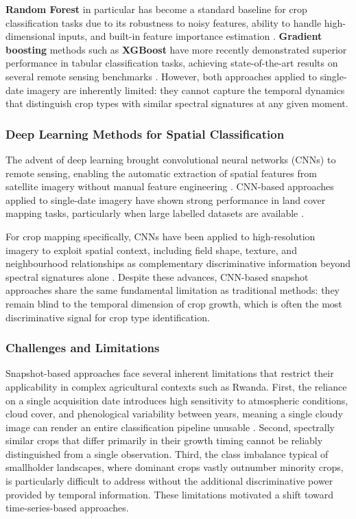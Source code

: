    \textbf{Random Forest} in particular has become a standard baseline 
    for crop classification tasks due to its robustness to 
    noisy features, ability to handle high-dimensional inputs, 
    and built-in feature importance estimation \cite{breiman2001}. 
    \textbf{Gradient boosting} methods such as \textbf{XGBoost} have more recently 
    demonstrated superior performance in tabular classification 
    tasks, achieving state-of-the-art results on several 
    remote sensing benchmarks \cite{chen2016}. However, both 
    approaches applied to single-date imagery are inherently 
    limited: they cannot capture the temporal dynamics that 
    distinguish crop types with similar spectral signatures 
    at any given moment.

    \subsubsection{Deep Learning Methods for Spatial Classification}
    
    The advent of deep learning brought convolutional neural 
    networks (CNNs) to remote sensing, enabling the automatic 
    extraction of spatial features from satellite imagery without 
    manual feature engineering \cite{lecun2015}. CNN-based 
    approaches applied to single-date imagery have shown strong 
    performance in land cover mapping tasks, particularly when 
    large labelled datasets are available \cite{maggiori2017}.

    For crop mapping specifically, CNNs have been applied to 
    high-resolution imagery to exploit spatial context, including
    field shape, texture, and neighbourhood relationships 
    as complementary discriminative information beyond 
    spectral signatures alone \cite{kussul2017}. Despite 
    these advances, CNN-based snapshot approaches share 
    the same fundamental limitation as traditional methods: 
    they remain blind to the temporal dimension of crop 
    growth, which is often the most discriminative signal 
    for crop type identification.


    \subsubsection{Challenges and Limitations}

    Snapshot-based approaches face several inherent limitations 
    that restrict their applicability in complex agricultural 
    contexts such as Rwanda. First, the reliance on a single 
    acquisition date introduces high sensitivity to atmospheric 
    conditions, cloud cover, and phenological variability 
    between years, meaning a single cloudy image can render an 
    entire classification pipeline unusable \cite{inglada2016}. 
    Second, spectrally similar crops that differ primarily 
    in their growth timing cannot be reliably distinguished 
    from a single observation. Third, the class imbalance 
    typical of smallholder landscapes, where dominant 
    crops vastly outnumber minority crops, is particularly 
    difficult to address without the additional discriminative 
    power provided by temporal information. These limitations 
    motivated a shift toward time-series-based approaches.

